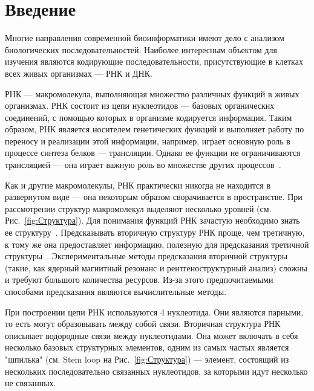 \documentclass[14pt]{matmex-diploma-custom}
\begin{document}
\section*{Введение}
Многие направления современной биоинформатики имеют дело с анализом биологических последовательностей. Наиболее интересным объектом для изучения являются кодирующие последовательности, присутствующие в клетках всех живых организмах --- РНК и ДНК. \par
РНК --- макромолекула, выполняющая множество различных функций в живых организмах. РНК состоит из цепи нуклеотидов --- базовых органических соединений, с помощью которых в организме кодируется информация. Таким образом, РНК является носителем генетических функций и выполняет работу по переносу и реализации этой информации, например, играет основную роль в процессе синтеза белков --- трансляции. Однако ее функции не ограничиваются трансляцией --- она играет важную роль во множестве других процессов~\cite{book:molcelbio}. \par
Как и другие макромолекулы, РНК практически никогда не находится в развернутом виде --- она некоторым образом сворачивается в пространстве. При рассмотрении структур макромолекул выделяют несколько уровней (см. Рис.~\ref{fig:Структура}). Для понимания функций РНК зачастую необходимо знать ее структуру~\cite{SARAIYA2008645, LEE1997732}. Предсказывать вторичную структуру РНК проще, чем третичную, к тому же она предоставляет информацию, полезную для предсказания третичной структуры~\cite{ipknot}. Экспериментальные методы предсказания вторичной структуры (такие, как ядерный магнитный резонанс и рентгеноструктурный анализ) сложны и требуют большого количества ресурсов. Из-за этого предпочитаемыми способами предсказания являются вычислительные методы. \par 
При построении цепи РНК используются 4 нуклеотида. Они являются парными, то есть могут образовывать между собой связи. Вторичная структура РНК описывает водородные связи между нуклеотидами. Она может включать в себя несколько базовых структурных элементов, одним из самых частых является "шпилька" (см. Stem loop на Рис.~\ref{fig:Структура}) --- элемент, состоящий из нескольких последовательно связанных нуклеотидов, за которыми идут несколько не связанных. \par 
\end{document}
